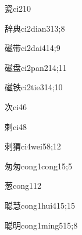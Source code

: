 \begin{verbete}{瓷}{ci2}{10}
\end{verbete}

\begin{verbete}{辞典}{ci2dian3}{13;8}
\end{verbete}

\begin{verbete}{磁带}{ci2dai4}{14;9}
\end{verbete}

\begin{verbete}{磁盘}{ci2pan2}{14;11}
\end{verbete}

\begin{verbete}{磁铁}{ci2tie3}{14;10}
\end{verbete}

\begin{verbete}{次}{ci4}{6}
\end{verbete}

\begin{verbete}{刺}{ci4}{8}
\end{verbete}

\begin{verbete}{刺猬}{ci4wei5}{8;12}
\end{verbete}

\begin{verbete}{匆匆}{cong1cong1}{5;5}
\end{verbete}

\begin{verbete}{葱}{cong1}{12}
\end{verbete}

\begin{verbete}{聪慧}{cong1hui4}{15;15}
\end{verbete}

\begin{verbete}{聪明}{cong1ming5}{15;8}
\end{verbete}

